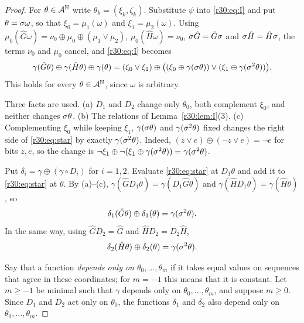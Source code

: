 \begin{proof}
For $\theta\in\mathcal{A}^{\mathbb{N}}$ write $\theta_k=(\xi_k,\zeta_k)$. Substitute $\psi$ into \eqref{r30:eq:I} and put $\theta=\sigma\omega$, so that $\xi_0=\mu_1(\omega)$ and $\xi_1=\mu_2(\omega)$. Using $\mu_0(\hat G\omega)=\nu_0\oplus\mu_0\oplus(\mu_1\vee\mu_2)$, $\mu_0(\hat H\omega)=\nu_0$, $\sigma\hat G=\hat G\sigma$ and $\sigma\hat H=\hat H\sigma$, the terms $\nu_0$ and $\mu_0$ cancel, and \eqref{r30:eq:I} becomes
\begin{equation}\label{r30:eq:star}
\gamma(\hat G\theta)\oplus\gamma(\hat H\theta)\oplus\gamma(\theta)=(\xi_0\vee \xi_1)\oplus\bigl((\xi_0\oplus\gamma(\sigma\theta))\vee(\xi_1\oplus\gamma(\sigma^2\theta))\bigr).
\end{equation}
This holds for every $\theta\in\mathcal{A}^{\mathbb{N}}$, since $\omega$ is arbitrary.

Three facts are used. (a) $D_1$ and $D_2$ change only $\theta_0$, both complement $\xi_0$, and neither changes $\sigma\theta$. (b) The relations of Lemma~\ref{r30:lem:I}(3). (c) Complementing $\xi_0$ while keeping $\xi_1$, $\gamma(\sigma\theta)$ and $\gamma(\sigma^2\theta)$ fixed changes the right side of \eqref{r30:eq:star} by exactly $\gamma(\sigma^2\theta)$. Indeed, $(z\vee e)\oplus(\neg z\vee e)=\neg e$ for bits $z,e$, so the change is $\neg \xi_1\oplus\neg(\xi_1\oplus\gamma(\sigma^2\theta))=\gamma(\sigma^2\theta)$.

Put $\delta_i=\gamma\oplus(\gamma\circ D_i)$ for $i=1,2$. Evaluate \eqref{r30:eq:star} at $D_1\theta$ and add it to \eqref{r30:eq:star} at $\theta$. By (a)--(c), $\gamma(\hat GD_1\theta)=\gamma(D_1\hat G\theta)$ and $\gamma(\hat HD_1\theta)=\gamma(\hat H\theta)$, so
\begin{equation}\label{r30:eq:one}
\delta_1(\hat G\theta)\oplus\delta_1(\theta)=\gamma(\sigma^2\theta).
\end{equation}
In the same way, using $\hat GD_2=\hat G$ and $\hat HD_2=D_2\hat H$,
\begin{equation}\label{r30:eq:two}
\delta_2(\hat H\theta)\oplus\delta_2(\theta)=\gamma(\sigma^2\theta).
\end{equation}

Say that a function \emph{depends only on $\theta_0,\dots,\theta_m$} if it takes equal values on sequences that agree in these coordinates; for $m=-1$ this means that it is constant. Let $m\ge-1$ be minimal such that $\gamma$ depends only on $\theta_0,\dots,\theta_m$, and suppose $m\ge0$. Since $D_1$ and $D_2$ act only on $\theta_0$, the functions $\delta_1$ and $\delta_2$ also depend only on $\theta_0,\dots,\theta_m$.


\end{proof}
